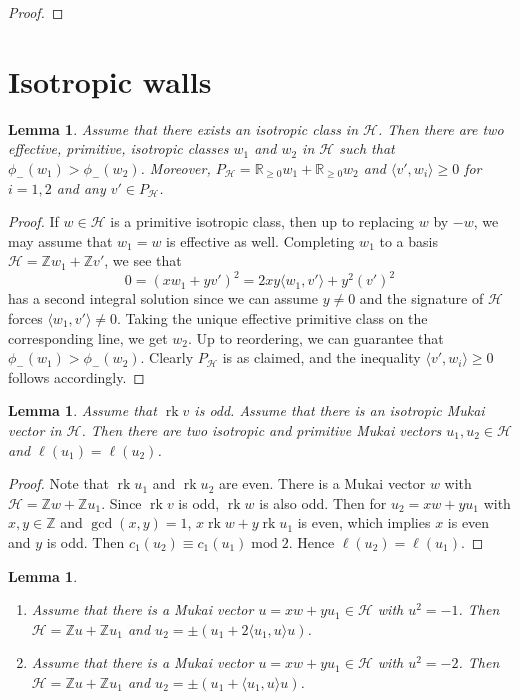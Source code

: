 \documentclass[leqno,11pt]{amsart}
\def\R{\ensuremath{\mathbb{R}}}
\def\Z{\ensuremath{\mathbb{Z}}}
\def\mod{\mathop{\mathrm{mod}}\nolimits}
\def\rk{\mathop{\mathrm{rk}}}
\newtheorem{Lem}[Thm]{Lemma}
\theoremstyle{definition}
\def\R{\ensuremath{\mathbb{R}}}
\def\Z{\ensuremath{\mathbb{Z}}}
\def\HH{\ensuremath{\mathcal H}}
\begin{document}
\begin{proof}
\end{proof}

\section{Isotropic walls}

\begin{Lem}\label{Lem:isotropic lattice} Assume that there exists an isotropic class in $\HH$.  Then there are two effective, primitive, isotropic classes $w_1$ and $w_2$ in $\HH$ such that $\phi_-(w_1)>\phi_-(w_2)$.  Moreover, $P_{\HH}=\R_{\geq 0}w_1+\R_{\geq 0}w_2$ and $\langle v',w_i\rangle\geq 0$ for $i=1,2$ and any $v'\in P_{\HH}$.
\end{Lem}
\begin{proof}
If $w\in\HH$ is a primitive isotropic class, then up to replacing $w$ by $-w$, we may assume that $w_1=w$ is effective as well.  Completing $w_1$ to a basis $\HH=\Z w_1+\Z v'$, we see that $$0=(x w_1+y v')^2=2xy\langle w_1,v'\rangle+y^2 (v')^2$$ has a second integral solution since we can assume $y\neq 0$ and the signature of $\HH$ forces $\langle w_1,v'\rangle\neq 0$.  Taking the unique effective primitive class on the corresponding line, we get $w_2$.  Up to reordering, we can guarantee that $\phi_-(w_1)>\phi_-(w_2)$.  Clearly $P_{\HH}$ is as claimed, and the inequality $\langle v',w_i\rangle\geq 0$ follows accordingly.
\end{proof}

\begin{Lem}
Assume that $\rk v$ is odd.
Assume that there is an isotropic Mukai vector in $\HH$.
Then there are two isotropic and primitive Mukai vectors
$u_1,u_2 \in \HH$ and $\ell(u_1)=\ell(u_2)$.
\end{Lem}

\begin{proof}
Note that $\rk u_1$ and $\rk u_2$ are even.
There is a Mukai vector $w$ with $\HH=\Z w+\Z u_1$.
Since $\rk v$ is odd, $\rk w$ is also odd. 
Then for $u_2=x w+y u_1$ with $x,y \in \Z$ and $\gcd(x,y)=1$,
$x \rk w+y \rk u_1$ is even, which implies $x$ is even and $y$ is odd.
Then $c_1(u_2) \equiv  c_1(u_1) \mod 2$.
Hence $\ell(u_2)=\ell(u_1)$.
\end{proof}




\begin{Lem}\label{Lem:negative stable classes}
\begin{enumerate}
\item[(1)]
Assume that there is a Mukai vector $u=x w+yu_1 \in \HH$ with $u^2=-1$. 
Then
$\HH=\Z u+\Z u_1$ and
$u_2=\pm(u_1+2 \langle u_1,u \rangle u)$.
\item[(2)]
Assume that there is a Mukai vector $u=x w+yu_1 \in \HH$ with $u^2=-2$.
Then $\HH=\Z u+\Z u_1$ and
$u_2=\pm(u_1+ \langle u_1,u \rangle u)$.
\end{enumerate}
\end{Lem}
\end{document}
